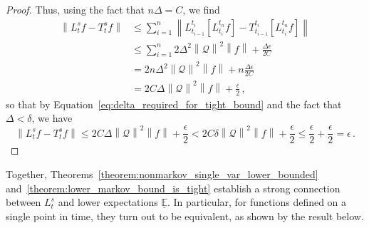 \documentclass[10pt]{paper}
\theoremstyle{definition}
\newcommand{\norm}[1]{\left\lVert #1 \right\rVert}
\begin{document}
\begin{proof}
Thus, using the fact that $n\Delta=C$, we find
\begin{align*}
\norm{L_t^sf - T_t^sf} &\leq \sum_{i=1}^n \norm{L_{t_{i-1}}^{t_i}\left[L_{t_i}^{t_n}f\right] - T_{t_{i-1}}^{t_i}\left[L_{t_i}^{t_n}f\right]} \\
 &\leq \sum_{i=1}^n 2\Delta^2\norm{\mathcal{Q}}^2\norm{f} + \frac{\Delta\epsilon}{2C} \\
 &= 2n\Delta^2\norm{\mathcal{Q}}^2\norm{f} + n\frac{\Delta\epsilon}{2C}\\
 &= 2C\Delta\norm{\mathcal{Q}}^2\norm{f} + \frac{\epsilon}{2}\,,
\end{align*}
so that by Equation~\eqref{eq:delta_required_for_tight_bound} and the fact that $\Delta<\delta$, we have
\begin{equation*}
\norm{L_t^sf - T_t^sf} \leq 2C\Delta\norm{\mathcal{Q}}^2\norm{f} + \frac{\epsilon}{2} < 2C\delta\norm{\mathcal{Q}}^2\norm{f} + \frac{\epsilon}{2} \leq \frac{\epsilon}{2} + \frac{\epsilon}{2} = \epsilon\,.
\end{equation*}
\end{proof}

Together, Theorems~\ref{theorem:nonmarkov_single_var_lower_bounded} and~\ref{theorem:lower_markov_bound_is_tight} establish a strong connection between $L_t^s$ and lower expectations $\underline{\mathbb{E}}$. In particular, for functions defined on a single point in time, they turn out to be equivalent, as shown by the result below.
\end{document}
